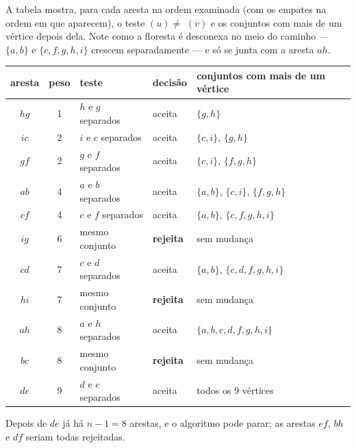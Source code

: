 \begin{exemplo}\label{ex:kruskalpasso}
A tabela mostra, para cada aresta na ordem examinada (com os empates na ordem em que aparecem), o teste \Find$(u)\ne$ \Find$(v)$ e os conjuntos com mais de um vértice depois dela. Note como a floresta é desconexa no meio do caminho --- $\{a,b\}$ e $\{c,f,g,h,i\}$ crescem separadamente --- e só se junta com a aresta $ah$.
\begin{center}\small
\begin{tabular}{@{}cclll@{}}
\toprule
aresta & peso & teste & decisão & conjuntos com mais de um vértice\\
\midrule
$hg$ & 1 & $h$ e $g$ separados & aceita & $\{g,h\}$\\
$ic$ & 2 & $i$ e $c$ separados & aceita & $\{c,i\}$, $\{g,h\}$\\
$gf$ & 2 & $g$ e $f$ separados & aceita & $\{c,i\}$, $\{f,g,h\}$\\
$ab$ & 4 & $a$ e $b$ separados & aceita & $\{a,b\}$, $\{c,i\}$, $\{f,g,h\}$\\
$cf$ & 4 & $c$ e $f$ separados & aceita & $\{a,b\}$, $\{c,f,g,h,i\}$\\
$ig$ & 6 & mesmo conjunto & \textbf{rejeita} & sem mudança\\
$cd$ & 7 & $c$ e $d$ separados & aceita & $\{a,b\}$, $\{c,d,f,g,h,i\}$\\
$hi$ & 7 & mesmo conjunto & \textbf{rejeita} & sem mudança\\
$ah$ & 8 & $a$ e $h$ separados & aceita & $\{a,b,c,d,f,g,h,i\}$\\
$bc$ & 8 & mesmo conjunto & \textbf{rejeita} & sem mudança\\
$de$ & 9 & $d$ e $e$ separados & aceita & todos os 9 vértices\\
\bottomrule
\end{tabular}
\end{center}
Depois de $de$ já há $n-1=8$ arestas, e o algoritmo pode parar; as arestas $ef$, $bh$ e $df$ seriam todas rejeitadas.
\end{exemplo}

